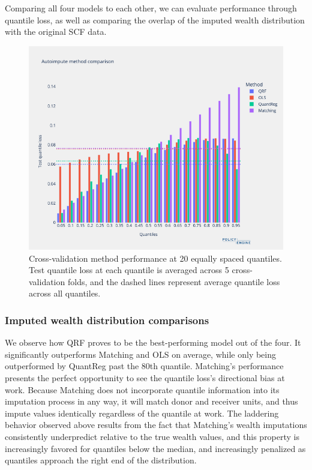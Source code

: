 Comparing all four models to each other, we can evaluate performance through quantile loss, as well as comparing the overlap of the imputed wealth distribution with the original SCF data. 

\begin{figure}[h]
    \centering
    \includegraphics[width=\textwidth]{figures/quantile_loss_comparison.png}
    \caption{Cross-validation method performance at 20 equally spaced quantiles. Test quantile loss at each quantile is averaged across 5 cross-validation folds, and the dashed lines represent average quantile loss across all quantiles.}
    \label{fig:quantile_loss_comparison}
\end{figure}

\subsubsection{Imputed wealth distribution comparisons}

We observe how QRF proves to be the best-performing model out of the four. It significantly outperforms Matching and OLS on average, while only being outperformed by QuantReg past the 80th quantile. Matching's performance presents the perfect opportunity to see the quantile loss's directional bias at work. Because Matching does not incorporate quantile information into its imputation process in any way, it will match donor and receiver units, and thus impute values identically regardless of the quantile at work. The laddering behavior observed above results from the fact that Matching's wealth imputations consistently underpredict relative to the true wealth values, and this property is increasingly favored for quantiles below the median, and increasingly penalized as quantiles approach the right end of the distribution. 

